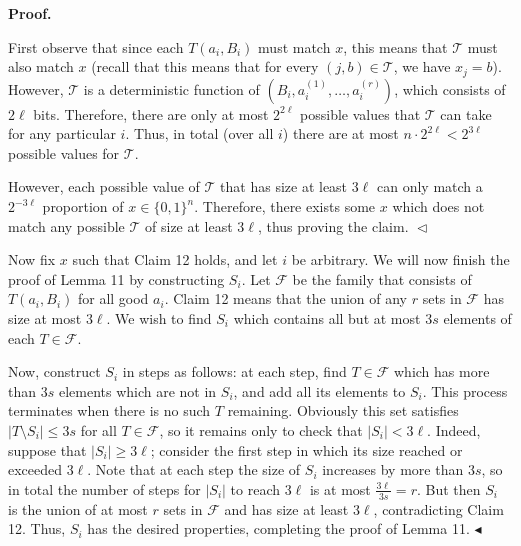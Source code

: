 \documentclass[10pt,a4paper]{article}
\begin{document}
\par\medskip\noindent\textbf{
\textbf{Proof}.}\par




First observe that since each $T(a_{i},B_{i})$ must match $x$, this means that ${\mathcal{T}}$ must also match $x$ (recall that this means that for every $(j,b)\in{\mathcal{T}}$, we have $x_{j}=b$). However, ${\mathcal{T}}$ is a deterministic function of $(B_{i},a_{i}^{(1)},\dots,a_{i}^{(r)})$, which consists of $2\ell$ bits. Therefore, there are only at most $2^{2\ell}$ possible values that ${\mathcal{T}}$ can take for any particular $i$. Thus, in total (over all $i$) there are at most $n\cdot 2^{2\ell}<2^{3\ell}$ possible values for ${\mathcal{T}}$.\par




However, each possible value of ${\mathcal{T}}$ that has size at least $3\ell$ can only match a $2^{-3\ell}$ proportion of $x\in\{0,1\}^{n}$. Therefore, there exists some $x$ which does not match any possible ${\mathcal{T}}$ of size at least $3\ell$, thus proving the claim.
$\vartriangleleft$\par




Now fix $x$ such that Claim 12 holds, and let $i$ be arbitrary. We will now finish the proof of Lemma 11 by constructing $S_{i}$. Let ${\mathcal{F}}$ be the family that consists of $T(a_{i},B_{i})$ for all good $a_{i}$. Claim 12 means that the union of any $r$ sets in ${\mathcal{F}}$ has size at most $3\ell$. We wish to find $S_{i}$ which contains all but at most $3s$ elements of each $T\in{\mathcal{F}}$.\par




Now, construct $S_{i}$ in steps as follows: at each step, find $T\in{\mathcal{F}}$ which has more than $3s$ elements which are not in $S_{i}$, and add all its elements to $S_{i}$. This process terminates when there is no such $T$ remaining. Obviously this set satisfies $|T\setminus S_{i}|\leq 3s$ for all $T\in{\mathcal{F}}$, so it remains only to check that $|S_{i}|<3\ell$. Indeed, suppose that $|S_{i}|\geq 3\ell$; consider the first step in which its size reached or exceeded $3\ell$. Note that at each step the size of $S_{i}$ increases by more than $3s$, so in total the number of steps for $|S_{i}|$ to reach $3\ell$ is at most $\frac{3\ell}{3s}=r$. But then $S_{i}$ is the union of at most $r$ sets in ${\mathcal{F}}$ and has size at least $3\ell$, contradicting Claim 12. Thus, $S_{i}$ has the desired properties, completing the proof of Lemma 11.
$\blacktriangleleft$\par
\end{document}

